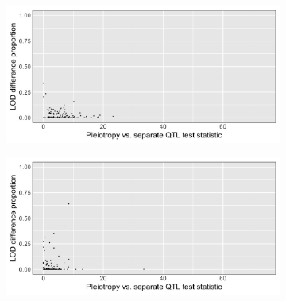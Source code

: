 \documentclass{article}
\begin{document}
\begin{figure}
\centering
\begin{subfigure}[t]{.38\textwidth}
\centering
\includegraphics[width=\linewidth]{bar_1.jpg}
        \caption{}\label{fig:fig_a}
\end{subfigure}
%
\begin{subfigure}[t]{.38\textwidth}
\centering
\includegraphics[width=\linewidth]{bar_2.jpg}
\caption{}\label{fig:fig_b}
\end{subfigure}

\medskip


\end{figure}
\end{document}
